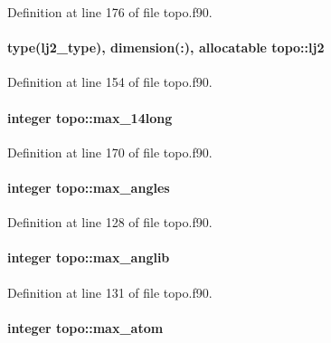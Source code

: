 Definition at line 176 of file topo.\-f90.

\hypertarget{classtopo_a5edb99fd66ebc120dc55c764018389a1}{
\paragraph[{lj2}]{\setlength{\rightskip}{0pt plus 5cm}type({\bf lj2\-\_\-type}), dimension(\-:), allocatable topo\-::lj2}}\label{classtopo_a5edb99fd66ebc120dc55c764018389a1}


Definition at line 154 of file topo.\-f90.

\hypertarget{classtopo_a7ae07d7e5923afe96b6827e0697fcd3f}{
\paragraph[{max\-\_\-14long}]{\setlength{\rightskip}{0pt plus 5cm}integer topo\-::max\-\_\-14long}}\label{classtopo_a7ae07d7e5923afe96b6827e0697fcd3f}


Definition at line 170 of file topo.\-f90.

\hypertarget{classtopo_a132cc719eeaf3f1f29ce8417010fb4b6}{
\paragraph[{max\-\_\-angles}]{\setlength{\rightskip}{0pt plus 5cm}integer topo\-::max\-\_\-angles}}\label{classtopo_a132cc719eeaf3f1f29ce8417010fb4b6}


Definition at line 128 of file topo.\-f90.

\hypertarget{classtopo_af2e022280b5f0e4ca0ccad0bc6f08a64}{
\paragraph[{max\-\_\-anglib}]{\setlength{\rightskip}{0pt plus 5cm}integer topo\-::max\-\_\-anglib}}\label{classtopo_af2e022280b5f0e4ca0ccad0bc6f08a64}


Definition at line 131 of file topo.\-f90.

\hypertarget{classtopo_a3ab7b1b9142e0426e8b147a00c78f36c}{
\paragraph[{max\-\_\-atom}]{\setlength{\rightskip}{0pt plus 5cm}integer topo\-::max\-\_\-atom}}\label{classtopo_a3ab7b1b9142e0426e8b147a00c78f36c}


